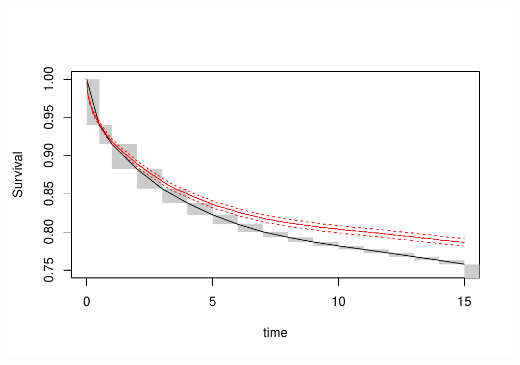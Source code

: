 \documentclass[
]{article}
\begin{document}
\includegraphics{hw_7_files/figure-latex/unnamed-chunk-7-1.pdf}
\end{document}
